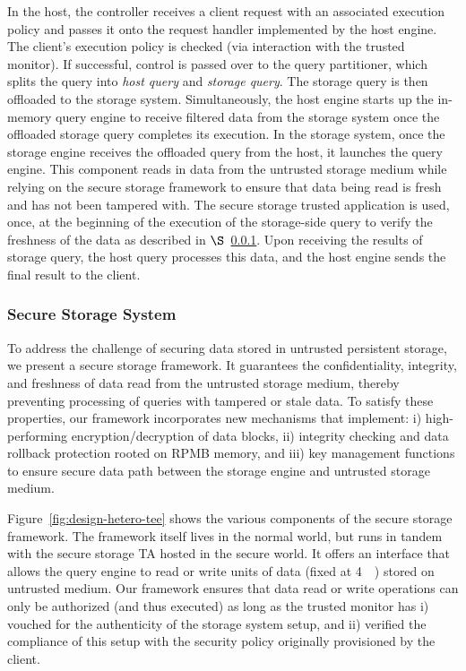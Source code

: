  In the host, the controller receives a client request with an associated execution policy and passes it onto the request handler implemented by the host engine. The client's execution policy is checked (via interaction with the trusted monitor). If successful, control is passed over to the query partitioner, which splits the query into \textit{host query} and \textit{storage query}. The storage query is then offloaded to the storage system. Simultaneously, the host engine starts up the in-memory query engine to receive filtered data from the storage system once the offloaded storage query completes its execution. In the storage system, once the storage engine receives the offloaded query from the host, it launches the query engine. This component reads in data from the untrusted storage medium while relying on the secure storage framework to ensure that data being read is fresh and has not been tampered with. The secure storage trusted application is used, once, at the beginning of the execution of the storage-side query to verify the freshness of the data as described in $\S$~\ref{subsec:design-storage}. Upon receiving the results of storage query, the host query processes this data, and the host engine sends the final result to the client. 




\subsubsection{Secure Storage System}
\label{subsec:design-storage}

To address the challenge of securing data stored in untrusted persistent storage, we present a secure storage framework. It guarantees the confidentiality, integrity, and freshness of data read from the untrusted storage medium, thereby preventing processing of queries with tampered or stale data. To satisfy these properties, our framework incorporates new mechanisms that implement: i) high-performing encryption/decryption of data blocks, ii) integrity checking and data rollback protection rooted on RPMB memory, and iii) key management functions to ensure secure data path between the storage engine and untrusted storage medium. 

Figure~\ref{fig:design-hetero-tee} shows the various components of the secure storage framework. The framework itself lives in the normal world, but runs in tandem with the secure storage TA hosted in the secure world. It offers an interface that allows the query engine to read or write units of data (fixed at \SI{4}{\kibi\byte}) stored on untrusted medium. Our framework ensures that data read or write operations can only be authorized (and thus executed) as long as the trusted monitor has i) vouched for the authenticity of the storage system setup, and ii) verified the compliance of this setup with the security policy originally provisioned by the client. 


